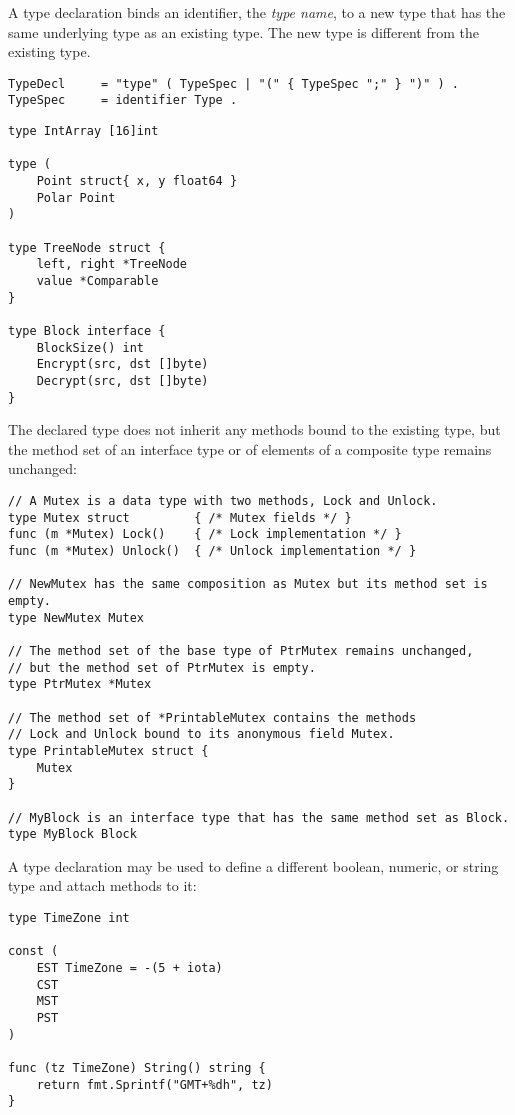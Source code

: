 A type declaration binds an identifier, the \emph{type name}, to a new
type that has the same underlying type as an existing
type. The new type is different from the
existing type.

\begin{Verbatim}[frame=single]
TypeDecl     = "type" ( TypeSpec | "(" { TypeSpec ";" } ")" ) .
TypeSpec     = identifier Type .
\end{Verbatim}

\begin{Verbatim}[frame=single]
type IntArray [16]int

type (
    Point struct{ x, y float64 }
    Polar Point
)

type TreeNode struct {
    left, right *TreeNode
    value *Comparable
}

type Block interface {
    BlockSize() int
    Encrypt(src, dst []byte)
    Decrypt(src, dst []byte)
}
\end{Verbatim}

The declared type does not inherit any
methods bound to the existing type, but
the method set of an interface type or of
elements of a composite type remains unchanged:

\begin{Verbatim}[frame=single]
// A Mutex is a data type with two methods, Lock and Unlock.
type Mutex struct         { /* Mutex fields */ }
func (m *Mutex) Lock()    { /* Lock implementation */ }
func (m *Mutex) Unlock()  { /* Unlock implementation */ }

// NewMutex has the same composition as Mutex but its method set is empty.
type NewMutex Mutex

// The method set of the base type of PtrMutex remains unchanged,
// but the method set of PtrMutex is empty.
type PtrMutex *Mutex

// The method set of *PrintableMutex contains the methods
// Lock and Unlock bound to its anonymous field Mutex.
type PrintableMutex struct {
    Mutex
}

// MyBlock is an interface type that has the same method set as Block.
type MyBlock Block
\end{Verbatim}

A type declaration may be used to define a different boolean, numeric,
or string type and attach methods to it:

\begin{Verbatim}[frame=single]
type TimeZone int

const (
    EST TimeZone = -(5 + iota)
    CST
    MST
    PST
)

func (tz TimeZone) String() string {
    return fmt.Sprintf("GMT+%dh", tz)
}
\end{Verbatim}

